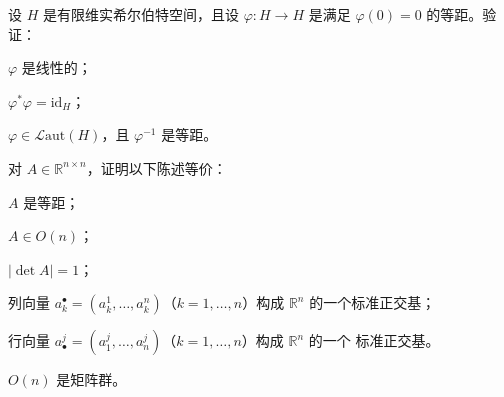 \begin{exercises}
\item

设 $ H $ 是有限维实希尔伯特空间，且设 $ \varphi : H \to H $ 是满足 $ \varphi(0) = 0 $ 的等距。验证：

\begin{items}
\item

$ \varphi $ 是线性的；

\item

$ \varphi^{*}\varphi = \mathrm{id}_{H} $；

\item

$ \varphi \in \mathcal{L}\mathrm{aut}(H) $，且 $ \varphi^{-1} $ 是等距。

\end{items}

\item

\begin{items}
\item

对 $ A \in \mathbb{R}^{n\times n} $，证明以下陈述等价：

\begin{subitems}
\item

$ A $ 是等距；

\item

$ A \in O(n) $；

\item

$ \left|\det A\right| = 1 $；

\item

列向量 $ a^{\bullet}_{k} = (a^{1}_{k}, \ldots, a^{n}_{k}) $（$ k = 1, \ldots, n $）构成 $ \mathbb{R}^{n} $ 的一个标准正交基；

\item

行向量 $ a^{j}_{\bullet} = (a^{j}_{1}, \ldots, a^{j}_{n}) $（$ k = 1, \ldots, n $）构成 $ \mathbb{R}^{n} $ 的一个 标准正交基。

\end{subitems}

\item

\proofhead
$ O(n) $ 是矩阵群。
\end{items}


\end{exercises}
